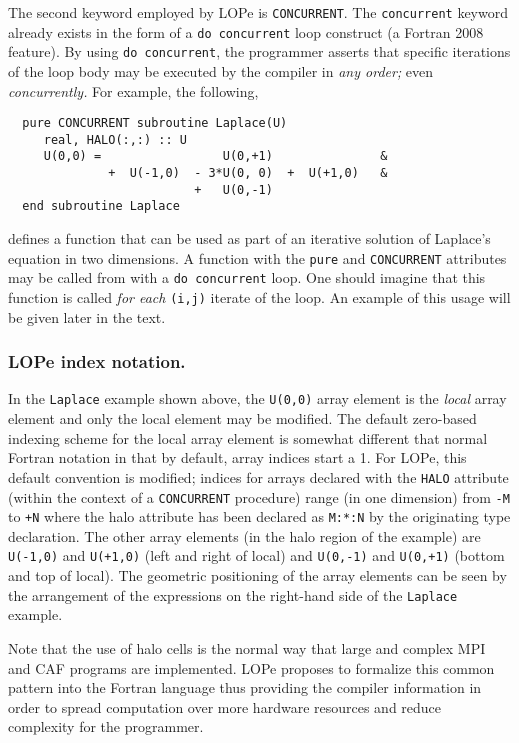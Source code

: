 The second keyword employed by LOPe is \texttt{CONCURRENT}.  The \texttt{concurrent} keyword already
exists in the form of a \texttt{do concurrent} loop construct (a Fortran 2008 feature).  By using
\texttt{do concurrent}, the programmer asserts that specific iterations of the loop body may be
executed by the compiler in \emph{any order;} even \emph{concurrently.}  For example, the following,
\begin{verbatim}
  pure CONCURRENT subroutine Laplace(U)
     real, HALO(:,:) :: U
     U(0,0) =                 U(0,+1)               &
              +  U(-1,0)  - 3*U(0, 0)  +  U(+1,0)   &
                          +   U(0,-1)
  end subroutine Laplace
\end{verbatim}
defines a function that can be used as part of an iterative solution of Laplace's equation in two
dimensions.  A function with the \texttt{pure} and \texttt{CONCURRENT} attributes may be called from
with a \texttt{do concurrent} loop.  One should imagine that this function is called \emph{for each}
\texttt{(i,j)} iterate of the loop.  An example of this usage will be given later in the text.

\subsubsection{LOPe index notation.}
In the \texttt{Laplace} example shown above, the \texttt{U(0,0)} array element is the \emph{local}
array element and only the local element may be modified.  The default zero-based indexing scheme
for the local array element is somewhat different that normal Fortran notation in that by default,
array indices start a 1.  For LOPe, this default convention is modified; indices for arrays declared
with the \texttt{HALO} attribute (within the context of a \texttt{CONCURRENT} procedure) range (in
one dimension) from \texttt{-M} to \texttt{+N} where the halo attribute has been declared as
\texttt{M:*:N} by the originating type declaration.  The other array elements (in the halo region of
the example) are \texttt{U(-1,0)} and \texttt{U(+1,0)} (left and right of local) and
\texttt{U(0,-1)} and \texttt{U(0,+1)} (bottom and top of local).  The geometric positioning of the
array elements can be seen by the arrangement of the expressions on the right-hand side of the
\texttt{Laplace} example.



Note that the use of halo cells is the normal way that large and complex MPI and CAF
programs are implemented.  LOPe proposes to formalize this common pattern into the Fortran
language thus providing the compiler information in order to spread computation over more
hardware resources and reduce complexity for the programmer.

